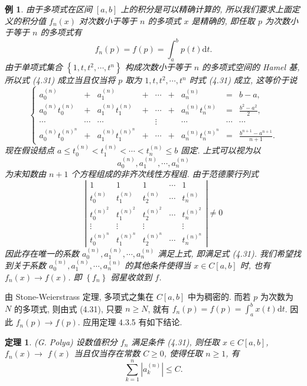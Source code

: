\documentclass[openany]{ctexbook}
\theoremstyle{kaiti}
\newtheorem{theorem}{定理}[section]
\theoremstyle{normal}
\newtheorem{example}{例}[section]
\begin{document}
\begin{example}
由于多项式在区间 $[a, b]$ 上的积分是可以精确计算的, 所以我们要求上面定义的积分值 $f_n(x)$ 对次数小于等于 $n$ 的多项式 $x$ 是精确的, 即任取 $p$ 为次数小于等于 $n$ 的多项式有
\begin{equation}
  f_n(p)=f(p)=\int_{a}^{b} p(t) \mathrm{d} t.
\end{equation}
由于单项式集合 $\left\{1, t, t^2, \cdots, t^n\right\}$ 构成次数小于等于 $n$ 的多项式空间的 Hamel 基, 所以式 (4.31) 成立当且仅当将 $p$ 取为 $1, t, t^2, \cdots, t^n$ 时式 (4.31) 成立, 这等价于说
$$
  \left\{\begin{array}{lllllllll}
    a_0^{(n)} & + & a_1^{(n)} & + & \cdots & + & a_n^{(n)} & = & b-a, \\
    a_0^{(n)} t_0^{(n)} & + & a_1^{(n)} t_1^{(n)} & + & \cdots & + & a_n^{(n)} t_n^{(n)} & = & \frac{b^2-a^2}{2}, \\
    \cdots & \cdots & \cdots & & \vdots & & \cdots & \cdots & \cdots \\
    a_0^{(n)} t_0^{(n)^n} & + & a_1^{(n)} t_1^{(n)^n} & + & \cdots & + & a_n^{(n)} t_n^{(n)^n} & = & \frac{b^{n+1}-a^{n+1}}{n+1}.
  \end{array}\right.
$$
现在假设结点 $a \leqslant t_0^{(n)}<t_1^{(n)}<\cdots<t_n^{(n)} \leqslant b$ 固定. 上式可以视为以
$$
a_0^{(n)}, a_1^{(n)}, \cdots, a_n^{(n)}
$$
为末知数由 $n+1$ 个方程组成的非齐次线性方程组. 由于范德蒙行列式
$$
\left|\begin{array}{ccccc}
1 & 1 & 1 & \cdots & 1 \\
t_0^{(n)} & t_1^{(n)} & t_2^{(n)} & \cdots & t_n^{(n)} \\
t_0^{(n)^2} & t_1^{(n)^2} & t_2^{(n)^2} & \cdots & t_n^{(n)^2} \\
\vdots & \vdots & \vdots & & \vdots \\
t_0^{(n)^n} & t_1^{(n)^n} & t_2^{(n)^n} & \cdots & t_n^{(n)^n}
\end{array}\right| \neq 0
$$
因此存在唯一的系数 $a_0^{(n)}, a_1^{(n)}, \cdots, a_n^{(n)}$ 满足上式, 即满足式 (4.31). 我们希望找到关于系数 $a_0^{(n)}, a_1^{(n)}, \cdots, a_n^{(n)}$ 的其他条件使得当 $x \in C[a, b]$ 时, 也有 $f_n(x) \rightarrow f(x)$. 即 $\left\{f_n\right\}$ 弱星收敛到 $f$.
\end{example}

由 Stone-Weierstrass 定理, 多项式之集在 $C[a, b]$ 中为稠密的. 而若 $p$ 为次数为 $N$ 的多项式, 则由式 (4.31), 只要 $n \geqslant N$, 就有 $f_n(p)=f(p)=\int_{a}^{b} x(t) \mathrm{d} t$. 因此 $f_n(p) \rightarrow f(p)$. 应用定理 4.3.5 有如下结论.

\begin{theorem}
(G. Polya) 设数值积分 $f_n$ 满足条件 (4.31), 则任取 $x \in C[a, b]$, $f_n(x) \rightarrow$ $f(x)$ 当且仅当存在常数 $C \geqslant 0$, 使得任取 $n \geqslant 1$, 有
$$
\sum_{k=1}^n\left|a_{k}^{(n)}\right| \leqslant C.
$$
\end{theorem}
\end{document}
